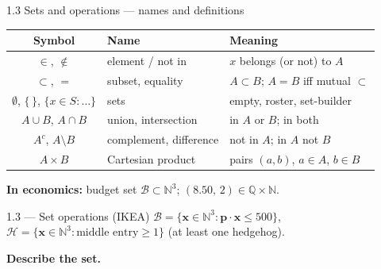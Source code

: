 \documentclass[11pt,aspectratio=169]{beamer}
\newcommand{\QFrame}[1]{%
  \begin{frame}{#1 \quad {\small\textcolor{mAccent}{Together}}}}
\begin{document}
\begin{frame}{1.3 Sets and operations --- names and definitions}
  \scriptsize
  \begin{tabular}{@{}clp{}@{}}
    \toprule
    \textbf{Symbol} & \textbf{Name} & \textbf{Meaning} \\
    \midrule
    $\in$, $\notin$ & element / not in & $x$ belongs (or not) to $A$ \\
    $\subset$, $=$ & subset, equality & $A\subset B$; $A=B$ iff mutual $\subset$ \\
    $\emptyset$, $\{\,\}$, $\{x\in S:\ldots\}$ & sets & empty, roster, set-builder \\
    $A\cup B$, $A\cap B$ & union, intersection & in $A$ or $B$; in both \\
    $A^c$, $A\setminus B$ & complement, difference & not in $A$; in $A$ not $B$ \\
    $A\times B$ & Cartesian product & pairs $(a,b)$, $a\in A$, $b\in B$ \\
    \bottomrule
  \end{tabular}

  \medskip
  \textbf{In economics:}\quad
  budget set $\mathcal{B}\subset\mathbb{N}^3$;\;
  $(8.50,\,2)\in\mathbb{Q}\times\mathbb{N}$.
\end{frame}

\QFrame{1.3 --- Set operations (IKEA)}
  \scriptsize
  $\mathcal{B}=\{\mathbf{x}\in\mathbb{N}^3:\mathbf{p}\cdot\mathbf{x}\le 500\}$,\quad
  $\mathcal{H}=\{\mathbf{x}\in\mathbb{N}^3:\text{middle entry}\ge 1\}$ (at least one hedgehog).

  \vspace{2pt}
  \textbf{Describe the set.}

  \vspace{2pt}
  \;
  \par
  \;
  \par
  \;
  \par
  \;
  \par
  \;
  \par
\end{frame}
\end{document}
